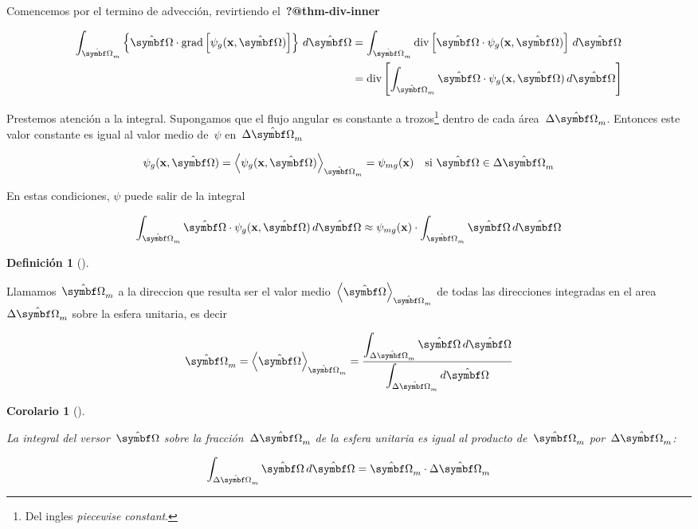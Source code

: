\documentclass[
  12pt,
  a4paper,
  table]{scrbook}
\theoremstyle{plain}
\theoremstyle{definition}
\newtheorem{definition}{Definición}[chapter]
\theoremstyle{plain}
\theoremstyle{plain}
\newtheorem{corollary}{Corolario}[chapter]
\theoremstyle{remark}
\begin{document}
Comencemos por el termino de advección, revirtiendo
el~\textbf{?@thm-div-inner}

\[
\begin{aligned}
\int_{\omegaversor_m} \left\{ \omegaversor \cdot \text{grad} \left[ \psi_g(\vec{x}, \omegaversor) \right] \right\} \, d\omegaversor
&=
\int_{\omegaversor_m}  \text{div} \left[ \omegaversor \cdot \psi_g(\vec{x}, \omegaversor) \right] \, d\omegaversor
\\
&=
\text{div} \left[ \int_{\omegaversor_m} \omegaversor \cdot \psi_g(\vec{x}, \omegaversor) \, d\omegaversor \right]
\end{aligned}
\]

Prestemos atención a la integral. Supongamos que el flujo angular es
constante a trozos\footnote{Del ingles
  \foreignlanguage{american}{\emph{piecewise constant}}.} dentro de cada
área~\(\Delta \omegaversor_m\). Entonces este valor constante es igual
al valor medio de~\(\psi\) en~\(\Delta \omegaversor_m\)

\[
\psi_g(\vec{x}, \omegaversor) = \left\langle \psi_g(\vec{x}, \omegaversor) \right\rangle_{\omegaversor_m} = \psi_{mg}(\vec{x})
\quad \text{si $\omegaversor \in \Delta \omegaversor_m$}
\]

En estas condiciones, \(\psi\) puede salir de la integral

\[
\int_{\omegaversor_m} \omegaversor \cdot \psi_g(\vec{x}, \omegaversor) \, d\omegaversor
\approx
\psi_{mg}(\vec{x}) \cdot \int_{\omegaversor_m} \omegaversor \, d\omegaversor
\]

\begin{definition}[]\protect\hypertarget{def-mean-omega}{}\label{def-mean-omega}

Llamamos~\(\omegaversor_m\) a la direccion que resulta ser el valor
medio~\(\left\langle \omegaversor \right\rangle_{\omegaversor_m}\) de
todas las direcciones integradas en el area~\(\Delta \omegaversor_m\)
sobre la esfera unitaria, es decir

\[
\omegaversor_m = \left\langle \omegaversor \right\rangle_{\omegaversor_m} =
\frac{ \displaystyle \int_{\Delta \omegaversor_m} \omegaversor \, d\omegaversor}{ \displaystyle \int_{\Delta \omegaversor_m} d\omegaversor}
\]

\end{definition}

\begin{corollary}[]\protect\hypertarget{cor-int-omega}{}\label{cor-int-omega}

La integral del versor~\(\omegaversor\) sobre la
fracción~\(\Delta \omegaversor_m\) de la esfera unitaria es igual al
producto de~\(\omegaversor_m\) por~\(\Delta \omegaversor_m\):

\[
\int_{\Delta \omegaversor_m} \omegaversor \, d\omegaversor
=
\omegaversor_m \cdot \Delta \omegaversor_m 
\]

\end{corollary}
\end{document}
